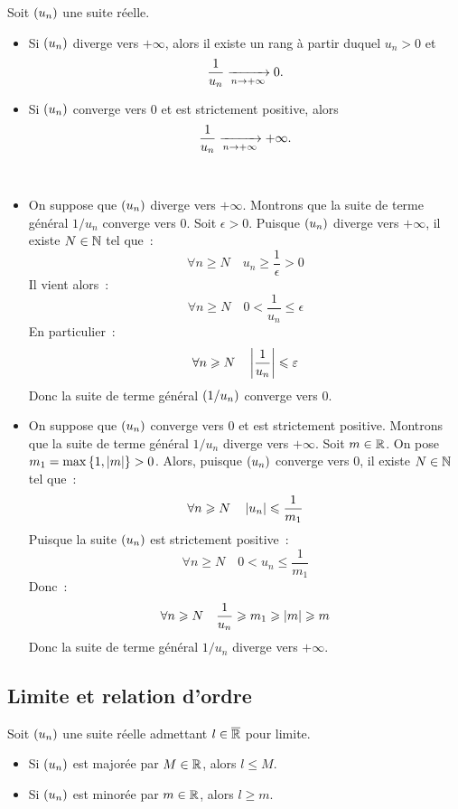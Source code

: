 \documentclass{magnoliaold}
\begin{document}
\begin{proposition}[utile=-3]
Soit $\left(u_n\right)$ une suite réelle.
\begin{itemize}
\item Si $\left(u_n\right)$ diverge vers $+\infty$, alors il existe un rang à partir
  duquel $u_n>0$ et
  \[\frac{1}{u_n} \xrightarrow[n\rightarrow +\infty]{} 0.\]
\item Si $\left(u_n\right)$ converge vers 0 et est strictement positive, alors
  \[\frac{1}{u_n} \xrightarrow[n\rightarrow +\infty]{} +\infty.\]
\end{itemize}
\end{proposition}

\begin{preuve}
$\quad$
\begin{itemize}
\item On suppose que $\left(u_n\right)$ diverge vers $+\infty$. Montrons
  que la suite de terme général $1/u_n$ converge vers 0. Soit $\epsilon>0$.
  Puisque $\left(u_n\right)$ diverge vers $+\infty$, il existe $N\in\mathbb{N}$ tel que~:
  \[\forall n\geq N \quad u_n \geq \frac{1}{\epsilon} > 0\]
  Il vient alors~:
  \[\forall n\geq N \quad 0 < \frac{1}{u_n} \leq \epsilon\]
  En particulier~:
  \[\forall n\geqslant N \quad \left|\frac{1}{u_n}\right| \leqslant \varepsilon\]
  Donc la suite de terme général $\left(1/u_n\right)$ converge vers 0.
\item On suppose que $\left(u_n\right)$ converge vers 0 et est strictement positive.
  Montrons que la suite de terme général $1/u_n$ diverge vers $+\infty$.
  Soit $m\in\mathbb{R}$. On pose $m_1=\max\left\{1,\left|m\right|\right\}>0$. Alors, puisque
  $\left(u_n\right)$ converge vers 0, il existe $N\in\mathbb{N}$ tel que~:
  \[\forall n\geqslant N \quad \left|u_n\right| \leqslant \frac{1}{m_1}\]
  Puisque la suite $\left(u_n\right)$ est strictement positive~:
  \[\forall n\geq N \quad 0 < u_n \leq \frac{1}{m_1}\]
  Donc~:
  \[\forall n\geqslant N \quad \frac{1}{u_n} \geqslant m_1 \geqslant \left|m\right| \geqslant m\]
  Donc la suite de terme général $1/u_n$ diverge vers $+\infty$.
\end{itemize}
\end{preuve}


\subsection{Limite et relation d'ordre}

\begin{proposition}[utile=-3]
Soit $\left(u_n\right)$ une suite réelle admettant $l\in\overline{\mathbb{R}}$ pour limite.
\begin{itemize}
\item Si $\left(u_n\right)$ est majorée par $M\in\mathbb{R}$, alors $l\leq M$.
\item Si $\left(u_n\right)$ est minorée par $m\in\mathbb{R}$, alors $l\geq m$.
\end{itemize}
\end{proposition}
\end{document}
